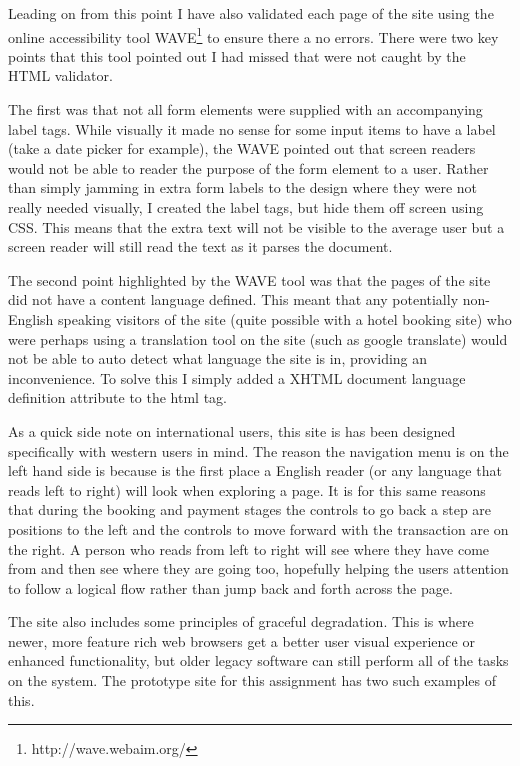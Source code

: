 \documentclass{article}
\begin{document}
Leading on from this point I have also validated each page of the site using the online accessibility tool WAVE\footnote{http://wave.webaim.org/} to ensure there a no errors. There were two key points that this tool pointed out I had missed that were not caught by the HTML validator. 

The first was that not all form elements were supplied with an accompanying label tags. While visually it made no sense for some input items to have a label (take a date picker for example), the WAVE pointed out that screen readers would not be able to reader the purpose of the form element to a user. Rather than simply jamming in extra form labels to the design where they were not really needed visually, I created the label tags, but hide them off screen using CSS. This means that the extra text will not be visible to the average user but a screen reader will still read the text as it parses the document. 

The second point highlighted by the WAVE tool was that the pages of the site did not have a content language defined. This meant that any potentially non-English speaking visitors of the site (quite possible with a hotel booking site) who were perhaps using a translation tool on the site (such as google translate) would not be able to auto detect what language the site is in, providing an inconvenience. To solve this I simply added a XHTML document language definition attribute to the html tag.

As a quick side note on international users, this site is has been designed specifically with western users in mind. The reason the navigation menu is on the left hand side is because is the first place a English reader (or any language that reads left to right) will look when exploring a page. It is for this same reasons that during the booking and payment stages the controls to go back a step are positions to the left and the controls to move forward with the transaction are on the right. A person who reads from left to right will see where they have come from and then see where they are going too, hopefully helping the users attention to follow a logical flow rather than jump back and forth across the page.

The site also includes some principles of graceful degradation. This is where newer, more feature rich web browsers get a better user visual experience or enhanced functionality, but older legacy software can still perform all of the tasks on the system. The prototype site for this assignment has two such examples of this. 
\end{document}
